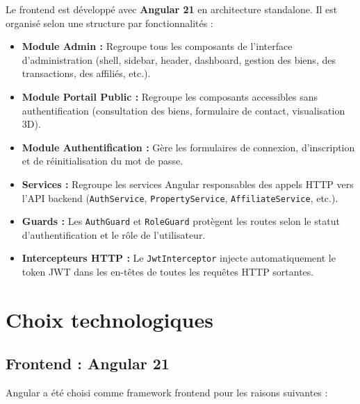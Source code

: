 \documentclass[a4paper,12pt]{report}
\begin{document}
Le frontend est développé avec \textbf{Angular 21} en architecture standalone. Il est organisé selon une structure par fonctionnalités :

\begin{itemize}
    \item \textbf{Module Admin :} Regroupe tous les composants de l'interface d'administration (shell, sidebar, header, dashboard, gestion des biens, des transactions, des affiliés, etc.).
    \item \textbf{Module Portail Public :} Regroupe les composants accessibles sans authentification (consultation des biens, formulaire de contact, visualisation 3D).
    \item \textbf{Module Authentification :} Gère les formulaires de connexion, d'inscription et de réinitialisation du mot de passe.
    \item \textbf{Services :} Regroupe les services Angular responsables des appels HTTP vers l'API backend (\texttt{AuthService}, \texttt{PropertyService}, \texttt{AffiliateService}, etc.).
    \item \textbf{Guards :} Les \texttt{AuthGuard} et \texttt{RoleGuard} protègent les routes selon le statut d'authentification et le rôle de l'utilisateur.
    \item \textbf{Intercepteurs HTTP :} Le \texttt{JwtInterceptor} injecte automatiquement le token JWT dans les en-têtes de toutes les requêtes HTTP sortantes.
\end{itemize}


\section{Choix technologiques}

\subsection{Frontend : Angular 21}

Angular a été choisi comme framework frontend pour les raisons suivantes :
\end{document}
